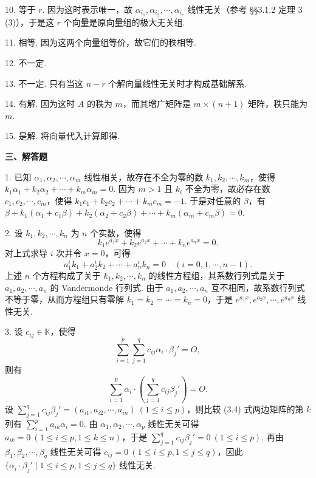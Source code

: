\documentclass[UTF8,12pt,a4paper,fontset=fandol]{ctexart}
\begin{document}
10. 等于 $r$. 因为这时表示唯一，故 $\alpha_{i_1},\alpha_{i_2},\cdots,\alpha_{i_r}$ 线性无关（参考 §§3.1.2 定理 3 (3)），于是这 $r$ 个向量是原向量组的极大无关组.

11. 相等. 因为这两个向量组等价，故它们的秩相等.

12. 不一定.

13. 不一定. 只有当这 $n-r$ 个解向量线性无关时才构成基础解系.

14. 有解. 因为这时 $A$ 的秩为 $m$，而其增广矩阵是 $m\times(n+1)$ 矩阵，秩只能为 $m$.

15. 是解. 将向量代入计算即得.

\noindent\textbf{三、解答题}

1. 已知 $\alpha_1,\alpha_2,\cdots,\alpha_m$ 线性相关，故存在不全为零的数 $k_1,k_2,\cdots,k_m$，使得 $k_1\alpha_1+k_2\alpha_2+\cdots+k_m\alpha_m=0$. 因为 $m>1$ 且 $k_i$ 不全为零，故必存在数 $c_1,c_2,\cdots,c_m$，使得 $k_1c_1+k_2c_2+\cdots+k_mc_m=-1$. 于是对任意的 $\beta$，有 $\beta+k_1(\alpha_1+c_1\beta)+k_2(\alpha_2+c_2\beta)+\cdots+k_m(\alpha_m+c_m\beta)=0$.

2. 设 $k_1,k_2,\cdots,k_n$ 为 $n$ 个实数，使得
\[
k_1e^{a_1x}+k_2e^{a_2x}+\cdots+k_ne^{a_nx}=0.
\]
对上式求导 $i$ 次并令 $x=0$，可得
\[
a_1^ik_1+a_2^ik_2+\cdots+a_n^ik_n=0\quad (i=0,1,\cdots,n-1).
\]
上述 $n$ 个方程构成了关于 $k_1,k_2,\cdots,k_n$ 的线性方程组，其系数行列式是关于 $a_1,a_2,\cdots,a_n$ 的 Vandermonde 行列式. 由于 $a_1,a_2,\cdots,a_n$ 互不相同，故系数行列式不等于零，从而方程组只有零解 $k_1=k_2=\cdots=k_n=0$，于是 $e^{a_1x},e^{a_2x},\cdots,e^{a_nx}$ 线性无关.

3. 设 $c_{ij}\in\mathbb{K}$，使得
\[
\sum_{i=1}^p\sum_{j=1}^q c_{ij}\alpha_i\cdot\beta_j'=O,
\]
则有
\begin{equation}
\sum_{i=1}^p \alpha_i\cdot\left(\sum_{j=1}^q c_{ij}\beta_j'\right)=O.
\tag{3.4}
\end{equation}
设 $\sum_{j=1}^q c_{ij}\beta_j'=(a_{i1},a_{i2},\cdots,a_{in})\ (1\le i\le p)$，则比较 (3.4) 式两边矩阵的第 $k$ 列有 $\sum_{i=1}^p a_{ik}\alpha_i=0$. 由 $\alpha_1,\alpha_2,\cdots,\alpha_p$ 线性无关可得 $a_{ik}=0\ (1\le i\le p,1\le k\le n)$，于是 $\sum_{j=1}^q c_{ij}\beta_j'=0\ (1\le i\le p)$. 再由 $\beta_1,\beta_2,\cdots,\beta_q$ 线性无关可得 $c_{ij}=0\ (1\le i\le p,1\le j\le q)$，因此 $\{\alpha_i\cdot\beta_j'\mid 1\le i\le p,1\le j\le q\}$ 线性无关.
\end{document}
